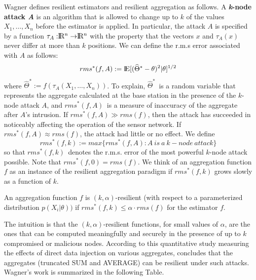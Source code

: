	Wagner \cite{wagner2004resilient} defines resilient estimators and resilient aggregation as follows.
	A \textbf{\textit{k}-node attack \textit{A}} is an algorithm that is allowed to change up to $k$ of the values $X_{1}, \dotsc, X_{n}$ before the estimator is applied.
	In particular, the attack $A$ is specified by a function $\tau_{A} : \R^n \rightarrow  \R^n $ with the property that the vectors $x$ and $\tau_{A}(x)$ never differ at more than $k$ positions.
	We can define the r.m.s error associated with $A$ as follows:
	\begin{equation}
		rms^*(f,A) := \rm I\!E[(\widehat{\Theta}^* - \theta)^2 | \theta]^{1/2} 		  
	\end{equation}
	where $\widehat{\Theta}^* := f(\tau_{A}(X_{1},\dotsc,X_{n}))$.
	To explain, $\widehat{\Theta}^*$\ is a random variable that represents the aggregate calculated at the base station in the presence of the $k$-node attack $A$, and $rms^*(f,A)$\ is a measure of inaccuracy of the aggregate after $A$'s intrusion.
	If $rms^*(f,A) \gg rms(f)$, then the attack has succeeded in noticeably affecting the operation of the sensor network.
	If $rms^*(f,A) \approx rms(f)$, the attack had little or no effect.
	We define
	\begin{equation}
		rms^*(f,k) := max\{rms^*(f,A): A\ is\ a\ k-node\ attack\}
	\end{equation}
	so that $rms^*(f,k)$\ denotes the r.m.s. error of the most powerful
	$k$-node attack possible. 
	Note that $rms^* (f, 0) = rms(f)$.
	We think of an aggregation function $f$ as an instance of the resilient aggregation paradigm if $rms^* (f, k)$ grows slowly as a function of $k$.
	\begin{definition}
		\cite{wagner2004resilient} An aggregation function $f$ is $(k, \alpha)$-resilient (with respect to a parameterized distribution $p(X_{i} | \theta))$ if $rms^*(f, k) \le \alpha \cdot rms(f)$ for the estimator $f$.
		\label{def:resilient}
	\end{definition}
	The intuition is that the $(k, \alpha)$-resilient functions, for small values of $\alpha$, are the ones that can be computed meaningfully and securely in the presence of up to $k$ compromised or malicious nodes.
	According to this quantitative study measuring the effects of direct data injection on various aggregates, concludes that the aggregates (truncated SUM and AVERAGE) can be resilient under such attacks.
	Wagner's work is summarized in the following Table.
